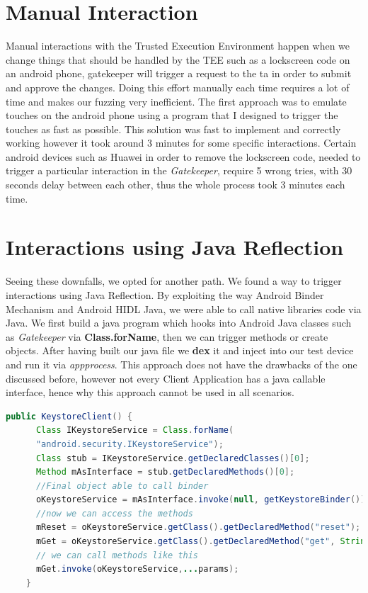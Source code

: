 \documentclass[a4paper,11pt,oneside]{report}
\begin{document}
\section{Manual Interaction}
Manual interactions with the Trusted Execution Environment happen when
we change things that should be handled by the TEE such as a lockscreen code on an android phone, gatekeeper will trigger a request
to the ta in order to submit and approve the changes. Doing this effort
manually each time requires a lot of time and makes our fuzzing very inefficient.
The first approach was to emulate touches on the android phone using a
program that I designed to trigger the touches as fast as possible.
This solution was fast to implement and correctly working however it
took around 3 minutes for some specific interactions.
Certain android devices such as Huawei in order to
remove the lockscreen code, needed to trigger a particular interaction in the
\emph{Gatekeeper}, require 5 wrong tries, with 30 seconds delay between
each other, thus the whole process took 3 minutes each time.
\section{Interactions using Java Reflection}
Seeing these downfalls, we opted
for another path. We found a way to trigger interactions using Java
Reflection. By exploiting the way Android Binder Mechanism and Android HIDL
Java, we were able to call native libraries code via Java. We first build a
java program which hooks into Android Java classes such as \emph{Gatekeeper}
via \textbf{Class.forName}, then we can trigger methods or create objects.
After having built our java file we \textbf{dex} it and inject into our test device and
run it via \emph{app\textunderscore process}. This approach does not have the
drawbacks of
the one discussed before, however not every Client Application has a java
callable interface, hence why this approach cannot be used in all scenarios.
\begin{lstlisting}[language=Java, caption="Example driver for Keystore"]
public KeystoreClient() {
      Class IKeystoreService = Class.forName(
      "android.security.IKeystoreService");
      Class stub = IKeystoreService.getDeclaredClasses()[0];
      Method mAsInterface = stub.getDeclaredMethods()[0];
      //Final object able to call binder
      oKeystoreService = mAsInterface.invoke(null, getKeystoreBinder());
      //now we can access the methods
      mReset = oKeystoreService.getClass().getDeclaredMethod("reset");
      mGet = oKeystoreService.getClass().getDeclaredMethod("get", String.class, int.class);
      // we can call methods like this
      mGet.invoke(oKeystoreService,...params);
    }
\end{lstlisting}
\end{document}
